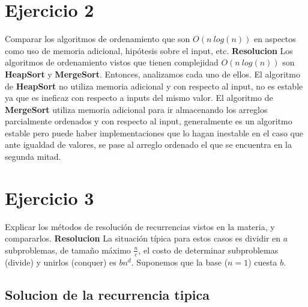 \documentclass[10pt,a4paper]{article}
\begin{document}
\section{Ejercicio 2}

Comparar los algoritmos de ordenamiento que son $O(n~log(n))$ en aspectos como uso de memoria adicional, hipótesis sobre el input, etc.
\newline
\newline
\textbf{Resolucion}
\newline
\newline
Los algoritmos de ordenamiento vistos que tienen complejidad $O(n~log(n))$ son \textbf{HeapSort} y \textbf{MergeSort}. Entonces, analizamos cada uno de ellos.
\newline
\newline
El algoritmo de \textbf{HeapSort} no utiliza memoria adicional y con respecto al input, no es estable ya que es ineficaz con respecto a inputs del mismo valor.  
\newline
\newline
El algoritmo de \textbf{MergeSort} utiliza memoria adicional para ir almacenando los arreglos parcialmente ordenados y con respecto al input, generalmente es un algoritmo estable pero puede haber implementaciones que lo hagan inestable en el caso que ante igualdad de valores, se pase al arreglo ordenado el que se encuentra en la segunda mitad.  
\newpage

\section{Ejercicio 3}

Explicar los métodos de resolución de recurrencias vistos en la materia, y compararlos.
\newline
\newline
\textbf{Resolucion}
\newline
\newline
La situación típica para estos casos es dividir en $a$ subproblemas, de tamaño máximo $\displaystyle \frac{n}{c}$, el costo de determinar subproblemas (divide) y unirlos (conquer) es $b n^{d}$. Suponemos que la base ($n=1$) cuesta $b$. 

\subsection{Solucion de la recurrencia tipica}
\end{document}
